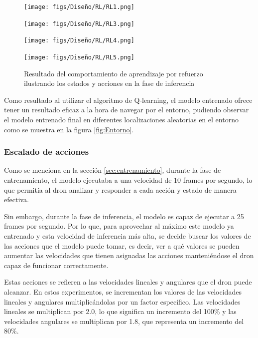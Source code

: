 \begin{figure}[H]
  \centering
  \begin{minipage}{0.3\textwidth}
    \texttt{[image: figs/Diseño/RL/RL1.png]}
  \end{minipage}
  \hfill
  \begin{minipage}{0.3\textwidth}
    \texttt{[image: figs/Diseño/RL/RL3.png]}
  \end{minipage}
  \hfill
  \begin{minipage}{0.3\textwidth}
    \texttt{[image: figs/Diseño/RL/RL4.png]}
  \end{minipage}
  \hfill
  \begin{minipage}{0.3\textwidth}
    \texttt{[image: figs/Diseño/RL/RL5.png]}
  \end{minipage}
  \caption{Resultado del comportamiento de aprendizaje por refuerzo ilustrando los estados y acciones en la fase de inferencia}
  \label{fig:inferencia-imagenes}
  \vspace{-1.5em}
\end{figure}

Como resultado al utilizar el algoritmo de Q-learning, el modelo entrenado ofrece tener un resultado eficaz a la hora de navegar por el entorno, pudiendo observar 
el modelo entrenado final en diferentes localizaciones aleatorias en el entorno como se muestra en la figura \ref{fig:Entorno}. 

\subsubsection{Escalado de acciones}
Como se menciona en la sección \ref{sec:entrenamiento}, durante la fase de entrenamiento, el modelo ejecutaba a una velocidad de 10 frames por segundo, lo que permitía al dron 
analizar y responder a cada acción y estado de manera efectiva. 

Sin embargo, durante la fase de inferencia, el modelo es capaz de ejecutar a 25 frames por segundo. Por lo que, para aprovechar al máximo este modelo ya entrenado y esta velocidad 
de inferencia más alta, se decide buscar los valores de las acciones que el modelo puede tomar, es decir, ver a qué valores se pueden aumentar las velocidades  que tienen asignadas
las acciones manteniéndose el dron capaz de funcionar correctamente.

Estas acciones se refieren a las velocidades lineales y angulares que el dron puede alcanzar. En estos experimentos, 
se incrementan los valores de las velocidades lineales y angulares multiplicándolas por un factor específico. Las velocidades lineales se multiplican por 2.0, lo que significa un incremento 
del 100\% y las velocidades angulares se multiplican por 1.8, que representa un incremento del 80\%. 

